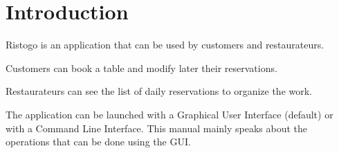 \section{Introduction}

Ristogo is an application that can be used by customers and restaurateurs.

Customers can book a table and modify later their reservations.

Restaurateurs can see the list of daily reservations to organize the work.

The application can be launched with a Graphical User Interface (default) or
with a Command Line Interface. This manual mainly speaks about the operations
that can be done using the GUI.
